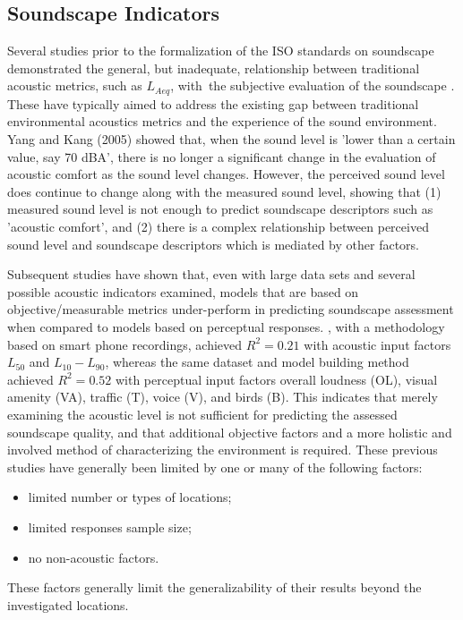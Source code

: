\subsection{Soundscape Indicators}
Several studies prior to the formalization of the ISO standards on soundscape demonstrated the general, but inadequate, relationship between traditional acoustic metrics, such as $L_{Aeq}$, with~the subjective evaluation of the soundscape \citep{Berglund2006Tool,Yang2005Acoustic,Rychtarikova2013Soundscape,Aumond2017Modeling,AlsinaPages2021Perceptual}. These have typically aimed to address the existing gap between traditional environmental acoustics metrics and the experience of the sound environment. Yang and Kang (2005) showed that, when the sound level is 'lower than a certain value, say 70 dBA', there is no longer a significant change in the evaluation of acoustic comfort as the sound level changes. However, the perceived sound level does continue to change along with the measured sound level, showing that (1) measured sound level is not enough to predict soundscape descriptors such as 'acoustic comfort', and (2) there is a complex relationship between perceived sound level and soundscape descriptors which is mediated by other factors.

Subsequent studies have shown that, even with large data sets and several possible acoustic indicators examined, models that are based on objective/measurable metrics under-perform in predicting soundscape assessment when compared to models based on perceptual responses. \citet{Ricciardi2015Sound}, with a methodology based on smart phone recordings, achieved $R^2 = 0.21$ with acoustic input factors $L_{50}$ and $L_{10} - L_{90}$, whereas the same dataset and model building method achieved $R^2 = 0.52$ with perceptual input factors overall loudness (OL), visual amenity (VA), traffic (T), voice (V), and birds (B). This indicates that merely examining the acoustic level is not sufficient for predicting the assessed soundscape quality, and that additional objective factors and a more holistic and involved method of characterizing the environment is required. These previous studies have generally been limited by one or many of the following factors:

\begin{itemize}
  \item limited number or types of locations;
  \item limited responses sample size;
  \item no non-acoustic factors.
\end{itemize}
These factors generally limit the generalizability of their results beyond the investigated locations.

